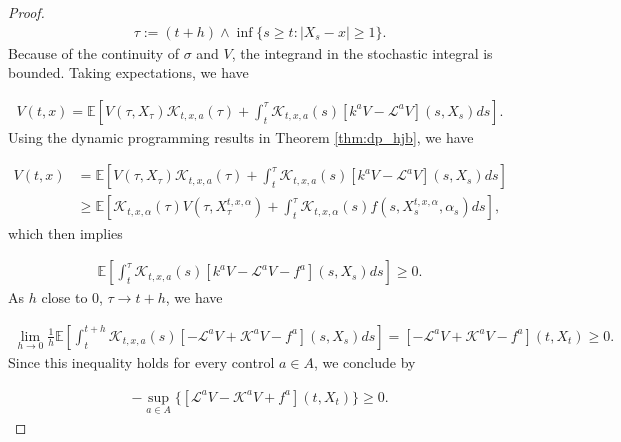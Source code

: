 \documentclass{article}
\begin{document}
\begin{proof}
\begin{equation} \label{stp_time_hjb}
\begin{aligned}
\tau:=(t+h)\wedge\inf\{s\geq t:|X_s-x|\geq1\}.
\end{aligned}
\end{equation}
Because of the continuity of $\sigma$ and $V$, the integrand in the stochastic integral is bounded. Taking expectations, we have

\begin{equation*}
\begin{aligned}
V(t,x)=\mathbb{E}\left[V(\tau,X_\tau)\mathcal{K}_{t,x,a}(\tau)+\int^\tau_t\mathcal{K}_{t,x,a}(s)[k^aV-\mathcal{L}^aV](s,X_s)ds\right].
\end{aligned}
\end{equation*}
Using the dynamic programming results in Theorem \ref{thm:dp_hjb}, we have 

\begin{equation*}
\begin{aligned}
V(t,x)&=\mathbb{E}\left[V(\tau,X_\tau)\mathcal{K}_{t,x,a}(\tau)+\int^\tau_t\mathcal{K}_{t,x,a}(s)[k^aV-\mathcal{L}^aV](s,X_s)ds\right]\\
&\geq\mathbb{E}\left[\mathcal{K}_{t,x,\alpha}(\tau)V(\tau,X_\tau^{t,x,\alpha})+\int^\tau_t\mathcal{K}_{t,x,\alpha}(s)f(s,X_s^{t,x,\alpha},\alpha_s)ds\right],
\end{aligned}
\end{equation*}
which then implies

\begin{equation*}
\begin{aligned}
\mathbb{E}\left[\int^\tau_t\mathcal{K}_{t,x,a}(s)[k^aV-\mathcal{L}^aV-f^a](s,X_s)ds\right]\geq0.
\end{aligned}
\end{equation*}
As $h$ close to $0$, $\tau\rightarrow t+h$, we have

\begin{equation*}
\begin{aligned}
\lim_{h\rightarrow0}\frac{1}{h}\mathbb{E}\left[\int^{t+h}_t\mathcal{K}_{t,x,a}(s)[-\mathcal{L}^aV+\mathcal{K}^aV-f^a](s,X_s)ds\right]=[-\mathcal{L}^aV+\mathcal{K}^aV-f^a](t,X_t)\geq0.
\end{aligned}
\end{equation*}
Since this inequality holds for every control $a\in A$, we conclude by 

\begin{equation*}
\begin{aligned}
-\sup_{a\in A}\{[\mathcal{L}^aV-\mathcal{K}^aV+f^a](t,X_t)\}\geq0.
\end{aligned}
\end{equation*}


\end{proof}
\end{document}
